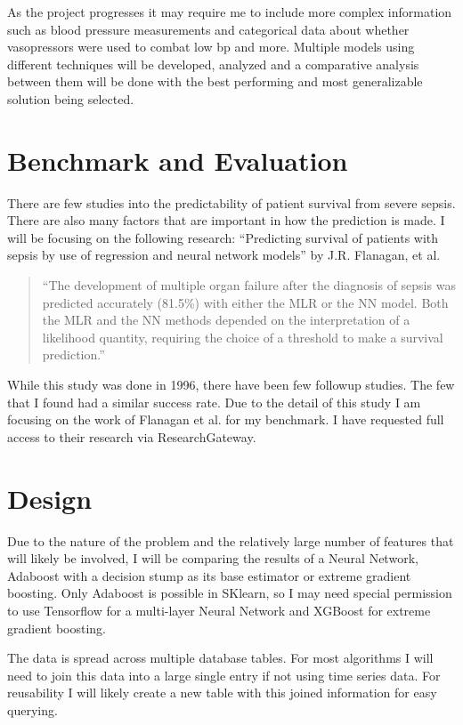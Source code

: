 \documentclass[11pt]{article}
\begin{document}
As the project progresses it may require me to include more complex information such as blood pressure measurements and categorical data about whether vasopressors were used to combat low bp and more.
Multiple models using different techniques will be developed, analyzed and a comparative analysis between them will be done with the best performing and most generalizable solution being selected.

\section{Benchmark and Evaluation}
There are few studies into the predictability of patient survival from severe sepsis. There are also many factors that are important in how the prediction is made. I will be focusing on the following research: ``Predicting survival of patients with sepsis by use of regression and neural network models'' by J.R. Flanagan, et al. \begin{quotation}
  ``The development of multiple organ failure after the diagnosis of sepsis was predicted accurately (81.5\%) with either the MLR or the NN model. Both the MLR and the NN methods depended on the interpretation of a likelihood quantity, requiring the choice of a threshold to make a survival prediction.''\cite{sepsisresearch}
\end{quotation}

While this study was done in 1996, there have been few followup studies. The few that I found had a similar success rate. Due to the detail of this study I am focusing on the work of Flanagan et al. for my benchmark. I have requested full access to their research via ResearchGateway.

\section{Design}
Due to the nature of the problem and the relatively large number of features that will likely be involved, I will be comparing the results of a Neural Network, Adaboost with a decision stump as its base estimator or extreme gradient boosting. Only Adaboost is possible in SKlearn, so I may need special permission to use Tensorflow for a multi-layer Neural Network and XGBoost for extreme gradient boosting.

The data is spread across multiple database tables. For most algorithms I will need to join this data into a large single entry if not using time series data. For reusability I will likely create a new table with this joined information for easy querying.


{}

\end{document}
